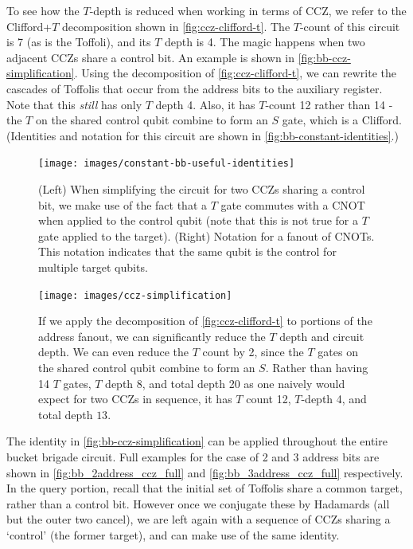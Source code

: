 \documentclass[a4paper,12pt]{article}
\begin{document}
To see how the $T$-depth is reduced when working in terms of CCZ, we refer to the Clifford+$T$ decomposition shown in \autoref{fig:ccz-clifford-t}. 
The $T$-count of this circuit is 7 (as is the Toffoli), and its $T$ depth is 4. 
The magic happens when two adjacent CCZs share a control bit. 
An example is shown in \autoref{fig:bb-ccz-simplification}. 
Using the decomposition of \autoref{fig:ccz-clifford-t}, we can rewrite the cascades of Toffolis that occur from the address bits to the auxiliary register. 
Note that this \emph{still} has only $T$ depth 4.
Also, it has $T$-count 12 rather than 14 - the $T$ on the shared control qubit combine to form an $S$ gate, which is a Clifford. 
(Identities and notation for this circuit are shown in \autoref{fig:bb-constant-identities}.)

\begin{figure}[ht]
 \centering
  \captionsetup{width=.89\linewidth}
 \texttt{[image: images/constant-bb-useful-identities]}
 \caption{(Left) When simplifying the circuit for two CCZs sharing a control bit, we make use of the fact that a $T$ gate commutes with a CNOT when applied to the control qubit (note that this is not true for a $T$ gate applied to the target). 
 (Right) Notation for a fanout of CNOTs. This notation indicates that the same qubit is the control for multiple target qubits.}
 \label{fig:bb-constant-identities}
\end{figure}

\begin{figure}
 \centering
  \captionsetup{width=.89\linewidth}
 \texttt{[image: images/ccz-simplification]}
 \caption{If we apply the decomposition of \autoref{fig:ccz-clifford-t} to portions of the address fanout, we can significantly reduce the $T$ depth and circuit depth. 
 We can even reduce the $T$ count by 2, since the $T$ gates on the shared control qubit combine to form an $S$.
 Rather than having 14 $T$ gates, $T$ depth 8, and total depth 20 as one naively would expect for two CCZs in sequence, it has $T$ count 12, $T$-depth 4, and total depth $13$.}
 \label{fig:bb-ccz-simplification}
\end{figure}

The identity in \autoref{fig:bb-ccz-simplification} can be applied throughout the entire bucket brigade circuit. 
Full examples for the case of 2 and 3 address bits are shown in \autoref{fig:bb_2address_ccz_full} and \autoref{fig:bb_3address_ccz_full} respectively. 
In the query portion, recall that the initial set of Toffolis share a common target, rather than a control bit.
However once we conjugate these by Hadamards (all but the outer two cancel), we are left again with a sequence of CCZs sharing a `control' (the former target), and can make use of the same identity.
\end{document}
